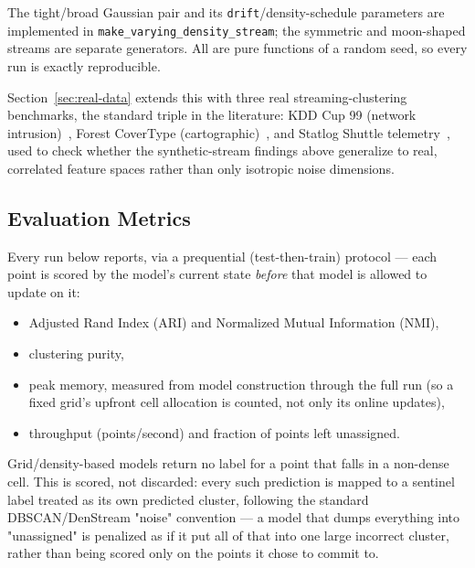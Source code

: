 \documentclass[11pt]{article}
\begin{document}
The tight/broad Gaussian pair and its \texttt{drift}/density-schedule parameters are implemented in \texttt{make\_varying\_density\_stream}; the symmetric and moon-shaped streams are separate generators. All are pure functions of a random seed, so every run is exactly reproducible.

Section~\ref{sec:real-data} extends this with three real streaming-clustering benchmarks, the standard triple in the literature: KDD Cup 99 (network intrusion)~\cite{KDDCup1999}, Forest CoverType (cartographic)~\cite{Blackard1999Covtype}, and Statlog Shuttle telemetry~\cite{Zhu2010StreamData}, used to check whether the synthetic-stream findings above generalize to real, correlated feature spaces rather than only isotropic noise dimensions.

\subsection{Evaluation Metrics}

Every run below reports, via a prequential (test-then-train) protocol — each point is scored by the model's current state \emph{before} that model is allowed to update on it:

\begin{itemize}
    \item Adjusted Rand Index (ARI) and Normalized Mutual Information (NMI),
    \item clustering purity,
    \item peak memory, measured from model construction through the full run (so a fixed grid's upfront cell allocation is counted, not only its online updates),
    \item throughput (points/second) and fraction of points left unassigned.
\end{itemize}

Grid/density-based models return no label for a point that falls in a non-dense cell. This is scored, not discarded: every such prediction is mapped to a sentinel label treated as its own predicted cluster, following the standard DBSCAN/DenStream "noise" convention — a model that dumps everything into "unassigned" is penalized as if it put all of that into one large incorrect cluster, rather than being scored only on the points it chose to commit to.
\end{document}
